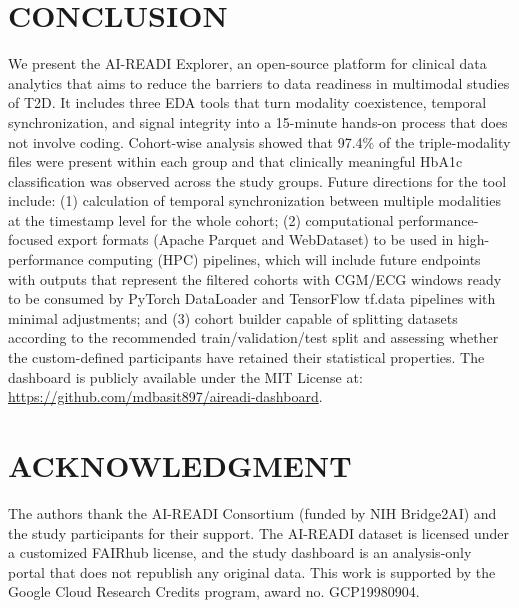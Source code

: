 \documentclass[conference]{IEEEtran}
\begin{document}
\section{CONCLUSION}
We present the AI-READI Explorer, an open-source platform for clinical data analytics that aims to reduce the barriers to data readiness in multimodal studies of T2D. It includes three EDA tools that turn modality coexistence, temporal synchronization, and signal integrity into a 15-minute hands-on process that does not involve coding. Cohort-wise analysis showed that 97.4\% of the triple-modality files were present within each group and that clinically meaningful HbA1c classification was observed across the study groups. Future directions for the tool include: (1) calculation of temporal synchronization between multiple modalities at the timestamp level for the whole cohort; (2) computational performance-focused export formats (Apache Parquet and WebDataset) to be used in high-performance computing (HPC) pipelines, which will include future endpoints with outputs that represent the filtered cohorts with CGM/ECG windows ready to be consumed by PyTorch DataLoader and TensorFlow tf.data pipelines with minimal adjustments; and (3) cohort builder capable of splitting datasets according to the recommended train/validation/test split and assessing whether the custom-defined participants have retained their statistical properties. The dashboard is publicly available under the MIT License at: \url{https://github.com/mdbasit897/aireadi-dashboard}.

\section{ACKNOWLEDGMENT}
The authors thank the AI-READI Consortium (funded by NIH Bridge2AI) and the study participants for their support. The AI-READI dataset is licensed under a customized FAIRhub license, and the study dashboard is an analysis-only portal that does not republish any original data. This work is supported by the Google Cloud Research Credits program, award no. GCP19980904.
\end{document}
